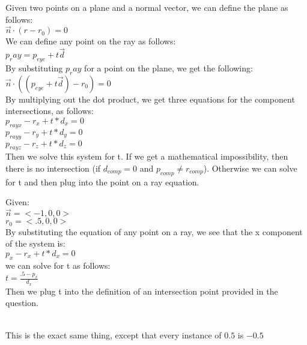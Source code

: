 \documentclass[10pt,twocolumn]{article}
\begin{document}
\begin{framed}

Given two points on a plane and a normal vector, we can define the plane as follows:\\


$\vec{n}\cdot(r - r_0) = 0$\\


We can define any point on the ray as follows:\\


$p_ray = p_{eye} + t\vec{d}$\\


By substituting $p_ray$ for a point on the plane, we get the following:\\


$\vec{n}\cdot((p_{eye} + t\vec{d}) - r_0) = 0$\\


By multiplying out the dot product, we get three equations for the component intersections, as follows:\\


$p_{rayx} - r_x + t * d_x = 0$\\


$p_{rayy} - r_y + t * d_y = 0$\\


$p_{rayz} - r_z + t * d_z = 0$\\


Then we solve this system for t. If we get a mathematical impossibility, then there is no intersection (if $d_{comp} = 0$ and $p_{comp} \neq r_{comp}$). Otherwise we can solve for t and then plug into the point on a ray equation.


Given:\\
$\vec{n} = <-1, 0, 0>$\\
$r_0 = <.5, 0, 0>$\\


By substituting the equation of any point on a ray, we see that the x component of the system is:\\


$p_x - r_x + t*d_x = 0$\\


we can solve for t as follows:\\


$t = \frac{.5 - p_x}{d_x}$\\


Then we plug t into the definition of an intersection point provided in the question.

\end{framed}
\begin{framed}
\\
This is the exact same thing, except that every instance of $0.5$ is $-0.5$
\end{framed}
\end{document}
